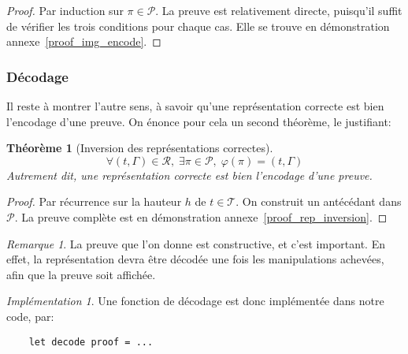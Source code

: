 \documentclass[11pt,a4paper]{article}
\theoremstyle{plain}
\newtheorem{theorem}{Théorème}
\theoremstyle{definition}
\theoremstyle{remark}
\newtheorem{remark}{Remarque}
\newtheorem{implementation}{Implémentation}
\newcommand*{\someproof}{\pi}
\newcommand*{\sequent}{\Gamma}
\newcommand*{\proofs}{\ensuremath{\mathcal{P}}}
\newcommand*{\trees}{\ensuremath{\mathcal{T}}}
\newcommand*{\representations}{\ensuremath{\mathcal{R}}}
\newcommand*{\encode}{\ensuremath{\varphi}}
\newcommand*{\height}{\ensuremath{h}}
\begin{document}
\begin{proof}
    Par induction sur $\someproof \in \proofs$. La preuve est relativement directe, puisqu'il suffit de vérifier les trois conditions pour chaque cas. Elle se trouve en démonstration annexe~\ref{proof_img_encode}.
\end{proof}

\subsubsection{Décodage}
Il reste à montrer l'autre sens, à savoir qu'une représentation correcte est bien l'encodage d'une preuve. On énonce pour cela un second théorème, le justifiant:

\begin{theorem}[Inversion des représentations correctes]
\label{rep_inversion}
\begin{equation*}
\forall (t, \sequent) \in \representations, \; \exists \someproof \in \proofs, \; \encode \left( \someproof \right) = (t, \sequent)
\end{equation*}
Autrement dit, une représentation correcte est bien l'encodage d'une preuve.
\end{theorem}

\begin{proof}
    Par récurrence sur la hauteur $\height$ de $t \in \trees$. On construit un antécédant dans $\proofs$. La preuve complète est en démonstration annexe~\ref{proof_rep_inversion}.
\end{proof}

\begin{remark}
    La preuve que l'on donne est constructive, et c'est important. En effet, la représentation devra être décodée une fois les manipulations achevées, afin que la preuve soit affichée.
\end{remark}

\begin{implementation}
    Une fonction de décodage est donc implémentée dans notre code, par:
    \begin{verbatim}
    let decode proof = ...
    \end{verbatim}
\end{implementation}
\end{document}
